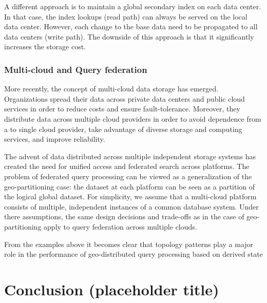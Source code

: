 A different approach is to maintain a global secondary index on each data center.
In that case, the index lookups (read path) can always be served on the local data center.
However, each change to the base data need to be propagated to all data centers (write path).
The downside of this approach is that it significantly increases the storage cost.

\subsubsection{Multi-cloud and Query federation}
More recently, the concept of multi-cloud data storage has emerged.
Organizations spread their data across private data centers and public cloud services in order to reduce costs and
ensure fault-tolerance.
Moreover, they distribute data across multiple cloud providers in order to avoid dependence from a to single
cloud provider, take advantage of diverse storage and computing services, and improve reliability.

The advent of data distributed across multiple independent storage systems has created the need for unified access and
federated search across platforms.
The problem of federated query processing can be viewed as a generalization of the geo-partitioning case:
the dataset at each platform can be seen as a partition of the logical global dataset.
For simplicity, we assume that a multi-cloud platform consists of multiple, independent instances of a common database
system.
Under there assumptions, the same design decisions and trade-offs as in the case of geo-partitioning apply to query
federation across multiple clouds.

\bigskip

From the examples above it becomes clear that topology patterns play a major role in the performance of geo-distributed
query processing based on derived state

\section{Conclusion (placeholder title)}


